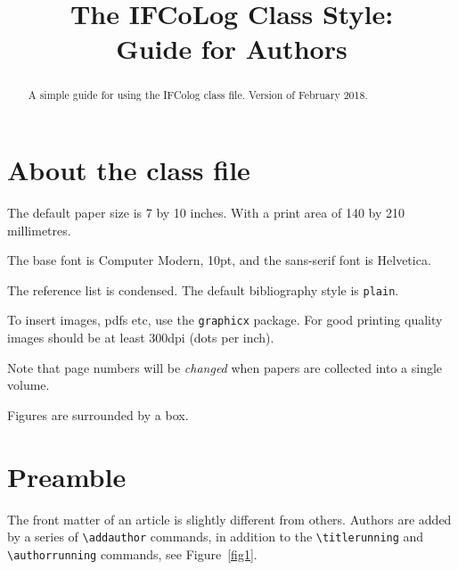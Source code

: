 \documentclass{ifcolog}
\title{The IFCoLog Class Style:\protect \\ Guide for Authors}
\begin{document}
\maketitle

\begin{abstract}
A simple guide for using the IFColog class file. 
Version of February 2018.
\end{abstract}



\section{About the class file}
\label{about}


\begin{enumerate*}
\item
The default paper size is 7 by 10 inches. With a print area of 140 by 210 millimetres.
\item
The base font is Computer Modern, 10pt, and the {\sf sans-serif} font is {\sf Helvetica}.
\item
The reference list is condensed. The default bibliography style is \texttt{plain}.
\item
To insert images, pdfs etc, use the \texttt{graphicx} package.
For good printing quality images should be at least 300dpi (dots per inch).
\item
Note that page numbers will be \emph{changed} when papers are collected into a single volume.
\item
Figures are surrounded by a box.
\end{enumerate*}

\section{Preamble}
\label{preamble}

The front matter of an article is slightly different from others. Authors are added by a series of \verb+\addauthor+ commands, in addition to the \verb+\titlerunning+ and \linebreak \verb+\authorrunning+
commands, see Figure~\ref{fig1}.
\end{document}
